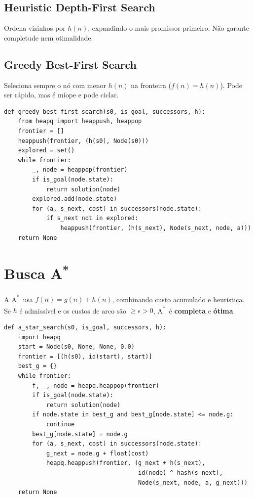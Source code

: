 \documentclass[9pt,a4paper]{extarticle}
\newcommand{\Astar}{A\textsuperscript{*}}
\begin{document}
\subsection*{Heuristic Depth-First Search}
Ordena vizinhos por $h(n)$, expandindo o mais promissor primeiro. Não garante completude nem otimalidade.

\subsection*{Greedy Best-First Search}
Seleciona sempre o nó com menor $h(n)$ na fronteira ($f(n)=h(n)$). Pode ser rápido, mas é míope e pode ciclar.

\begin{lstlisting}
def greedy_best_first_search(s0, is_goal, successors, h):
    from heapq import heappush, heappop
    frontier = []
    heappush(frontier, (h(s0), Node(s0)))
    explored = set()
    while frontier:
        _, node = heappop(frontier)
        if is_goal(node.state):
            return solution(node)
        explored.add(node.state)
        for (a, s_next, cost) in successors(node.state):
            if s_next not in explored:
                heappush(frontier, (h(s_next), Node(s_next, node, a)))
    return None
\end{lstlisting}

\section{Busca \Astar}

A \Astar\ usa $f(n)=g(n)+h(n)$, combinando custo acumulado e heurística.
Se $h$ é admissível e os custos de arco são $\ge \epsilon>0$, \Astar\ é \textbf{completa} e \textbf{ótima}.

\begin{lstlisting}
def a_star_search(s0, is_goal, successors, h):
    import heapq
    start = Node(s0, None, None, 0.0)
    frontier = [(h(s0), id(start), start)]
    best_g = {}
    while frontier:
        f, _, node = heapq.heappop(frontier)
        if is_goal(node.state):
            return solution(node)
        if node.state in best_g and best_g[node.state] <= node.g:
            continue
        best_g[node.state] = node.g
        for (a, s_next, cost) in successors(node.state):
            g_next = node.g + float(cost)
            heapq.heappush(frontier, (g_next + h(s_next),
                                      id(node) ^ hash(s_next),
                                      Node(s_next, node, a, g_next)))
    return None
\end{lstlisting}
\end{document}
